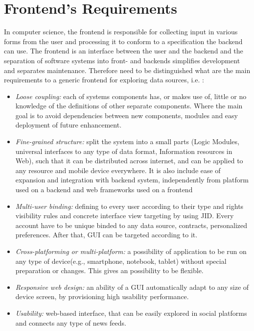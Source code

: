 \section {Frontend's Requirements}
	In computer science, the frontend is responsible for collecting input in various forms from the user and processing it to conform to a specification the backend can use. The frontend is an interface between the user and the backend\cite{wiki:xxx} and the separation of software systems into front- and backends simplifies development and separates maintenance. Therefore need to be distinguished what are the main requirements to a generic frontend for exploring data sources, i.e. :
\begin{itemize}

\item \emph{Loose coupling:} each of systems components has, or makes use of, little or no knowledge of the definitions of other 
       separate components. Where the main goal is to avoid dependencies between new components, modules and easy deployment of future enhancement.
\item \emph{Fine-grained structure:} split the system into a small parts (Logic Modules, universal interfaces to any type of data 
      format, Information resources in Web), such that it can be distributed across internet, and can be applied to any resource and mobile device everywhere. It is also include ease of expansion and integration with backend system, independently from platform used on a backend and web frameworks used on a frontend
\item \emph{Multi-user binding:} defining to every user according to their type and rights visibility rules and concrete interface view  
       targeting by using JID. Every account have to be unique binded to any data source, contracts, personalized preferences. After that, GUI can be targeted according to it.
\item \emph{Cross-platforming or multi-platform:} a possibility of application to be run on any type of device(e.g., smartphone, notebook, tablet) without special preparation or changes. This gives an possibility to be flexible.
\item \emph{Responsive web design:} an ability of a GUI automatically adapt to any size of device screen, by provisioning high usability performance.
\item \emph{Usability:} web-based interface, that can be easily explored in social platforms and connects any type of news feeds.
\end{itemize} 

